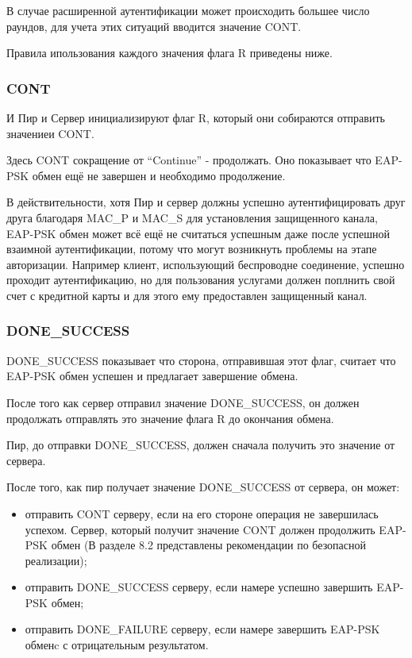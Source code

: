 В случае расширенной аутентификации может происходить большее число раундов, для учета этих ситуаций вводится значение CONT.

Правила ипользования каждого значения флага R приведены ниже.

\subsubsection{CONT}

И Пир и Сервер инициализируют флаг R, который они собираются отправить значениеи CONT.

Здесь CONT сокращение от ``Continue'' - продолжать. Оно показывает что EAP-PSK обмен ещё не завершен и необходимо продолжение.

В действительности, хотя Пир и сервер должны успешно аутентифицировать друг друга благодаря MAC\_P и MAC\_S для установления защищенного канала, EAP-PSK обмен может всё ещё не считаться успешным даже после успешной взаимной аутентификации, потому что могут возникнуть проблемы на этапе авторизации. Например клиент, использующий беспроводне соединение, успешно проходит аутентификацию, но для пользования услугами должен поплнить свой счет с кредитной карты и для этого ему предоставлен защищенный канал.

\subsubsection{DONE\_SUCCESS}

DONE\_SUCCESS показывает что сторона, отправившая этот флаг, считает что EAP-PSK обмен успешен и предлагает завершение обмена.

После того как сервер отправил значение DONE\_SUCCESS, он должен продолжать отправлять это значение флага R до окончания обмена.

Пир, до отправки DONE\_SUCCESS, должен сначала получить это значение от сервера.

После того, как пир получает значение DONE\_SUCCESS от сервера, он может:

\begin{itemize}
\item отправить CONT серверу, если на его стороне операция не завершилась успехом. Сервер, который получит значение CONT должен продолжить EAP-PSK обмен (В разделе 8.2 представлены рекомендации по безопасной реализации);
\item отправить DONE\_SUCCESS серверу, если намере успешно завершить EAP-PSK обмен;
\item отправить DONE\_FAILURE серверу, если намере завершить EAP-PSK обменc с отрицательным результатом.
\end{itemize}

